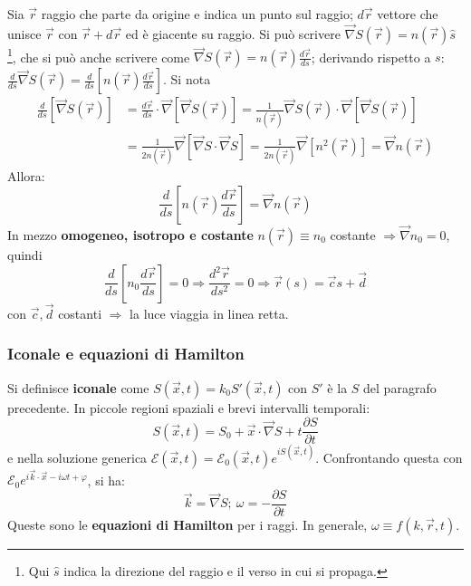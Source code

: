 \documentclass[a4paper]{scrartcl}
\numberwithin{equation}{subsection}
\theoremstyle{style1}
\begin{document}
Sia $\vec{r}$ raggio che parte da origine e indica un punto sul raggio; $d\vec{r}$ vettore che unisce $\vec{r}$ con $\vec{r}+d\vec{r}$ ed \`e giacente su raggio. Si pu\`o scrivere $\vec{\nabla }S(\vec{r})=n(\vec{r}) \hat{s}$\footnote{Qui $\hat{s}$ indica la direzione del raggio e il verso in cui si propaga.}, che si pu\`o anche scrivere come $\vec{\nabla }S(\vec{r}) = n(\vec{r}) \frac{d \vec{r}}{d s} $; derivando rispetto a $s$: $\frac{d }{d s} \vec{\nabla }S(\vec{r}) = \frac{d }{d s} \left[ n(\vec{r}) \frac{d \vec{r}}{d s} \right] $. Si nota
\[
\begin{split}
	\frac{d }{d s} \left[ \vec{\nabla }S(\vec{r}) \right] &= \frac{d \vec{r}}{d s}\cdot \vec{\nabla }  \left[ \vec{\nabla }S(\vec{r}) \right] = \frac{1}{n(\vec{r})}\vec{\nabla }S(\vec{r}) \cdot \vec{\nabla }\left[ \vec{\nabla }S(\vec{r}) \right] \\
							      &=\frac{1}{2n(\vec{r})} \vec{\nabla }\left[ \vec{\nabla }S \cdot \vec{\nabla }S \right] = \frac{1}{2n(\vec{r})}\vec{\nabla }\left[ n^2 (\vec{r})\right] = \vec{\nabla}n(\vec{r})
\end{split}
\] 
Allora:
\begin{equation}
	\frac{d }{d s} \left[ n(\vec{r}) \frac{d \vec{r}}{d s}  \right] = \vec{\nabla }n(\vec{r})
\end{equation}
In mezzo \textbf{omogeneo, isotropo e costante} $n(\vec{r}) \equiv n_0$  costante $\Rightarrow \vec{\nabla }n_0 = 0$, quindi 
\begin{equation}
	\frac{d }{d s} \left[ n_0 \frac{d \vec{r}}{d s}  \right] = 0 \Rightarrow \frac{d ^2\vec{r}}{d s^2} = 0 \Rightarrow \vec{r}(s) = \vec{c}s + \vec{d} 
\end{equation}
con $\vec{c},\vec{d}$ costanti $\Rightarrow $ la luce viaggia in linea retta.

\subsubsection{Iconale e equazioni di Hamilton}

Si definisce \textbf{iconale} come $S(\vec{x},t) = k_0 S'(\vec{x},t)$ con $S'$ \`e la $S$ del paragrafo precedente. In piccole regioni spaziali e brevi intervalli temporali:
\begin{equation}
	S(\vec{x},t) = S_0 + \vec{x}\cdot \vec{\nabla }S + t \frac{\partial S}{\partial t} 
\end{equation}
e nella soluzione generica $\mathcal{E}(\vec{x},t) = \mathcal{E}_0 (\vec{x},t) e^{i S(\vec{x},t)} $. Confrontando questa con $\mathcal{E}_0 e^{i \vec{k}\cdot \vec{x}-i \omega t + \varphi } $, si ha:
\begin{equation}
	\vec{k}= \vec{\nabla }S ;\ \omega =- \frac{\partial S}{\partial t} 
\end{equation}
Queste sono le \textbf{equazioni di Hamilton} per i raggi. In generale, $\omega \equiv f(k,\vec{r},t)$.
\end{document}

